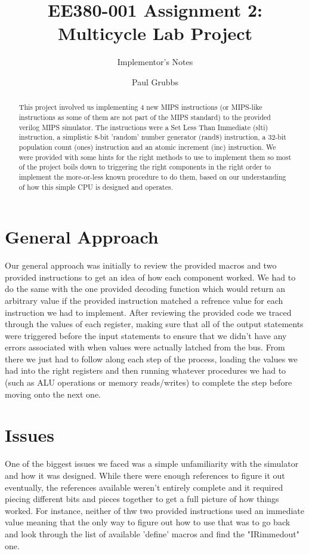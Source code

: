 \documentclass[acmtog]{acmart}
\begin{document}

\title{EE380-001 Assignment 2: Multicycle Lab Project}
\subtitle{Implementor's Notes}

\author{Paul Grubbs}
\author{}
\author{}

\begin{abstract}
  This project involved us implementing 4 new MIPS instructions (or MIPS-like instructions as some of them are not part of the MIPS standard)
  to the provided verilog MIPS simulator. The instructions were a Set Less Than Immediate (slti) instruction, a simplistic 8-bit 'random' number generator
  (rand8) instruction, a 32-bit population count (ones) instruction and an atomic increment (inc) instruction. We were provided with some hints for 
  the right methods to use to implement them so most of the project boils down to triggering the right components in the right order to 
  implement the more-or-less known procedure to do them, based on our understanding of how this simple CPU is designed and operates.
\end{abstract}

\maketitle

\section{General Approach}
Our general approach was initially to review the provided macros and two provided instructions to get an idea of how each component worked. We had to 
do the same with the one provided decoding function which would return an arbitrary value if the provided instruction matched a refrence value for 
each instruction we had to implement. After reviewing the provided code we traced through the values of each register, making sure that all of the 
output statements were triggered before the input statements to ensure that we didn't have any errors associated with when values were actually latched 
from the bus. From there we just had to follow along each step of the process, loading the values we had into the right registers and then running whatever
procedures we had to (such as ALU operations or memory reads/writes) to complete the step before moving onto the next one.
\section{Issues}
One of the biggest issues we faced was a simple unfamiliarity with the simulator and how it was designed. While there were enough references to figure it out
eventually, the references available weren't entirely complete and it required piecing different bits and pieces together to get a full picture of how things
worked. For instance, neither of thw two provided instructions used an immediate value meaning that the only way to figure out how to use that was to go back 
and look through the list of available 'define' macros and find the "IRimmedout" one.
\end{document}
